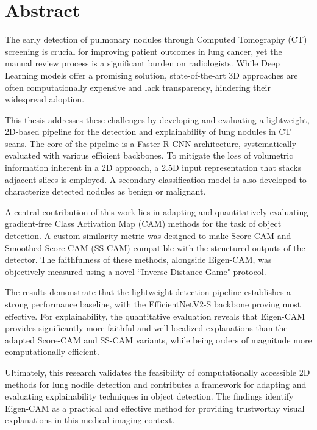 \documentclass{book}
\begin{document}
\fontsize{11.5pt}{14pt}\selectfont
 

\frontmatter
\chapter*{Abstract}
    The early detection of pulmonary nodules through Computed Tomography (CT) screening is crucial for improving patient outcomes in lung cancer, yet the manual review process is a significant burden on radiologists. While Deep Learning models offer a promising solution, state-of-the-art 3D approaches are often computationally expensive and lack transparency, hindering their widespread adoption.

    This thesis addresses these challenges by developing and evaluating a lightweight, 2D-based pipeline for the detection and explainability of lung nodules in CT scans. The core of the pipeline is a Faster R-CNN architecture, systematically evaluated with various efficient backbones. To mitigate the loss of volumetric information inherent in a 2D approach, a 2.5D input representation that stacks adjacent slices is employed. A secondary classification model is also developed to characterize detected nodules as benign or malignant.

    A central contribution of this work lies in adapting and quantitatively evaluating gradient-free Class Activation Map (CAM) methods for the task of object detection. A custom similarity metric was designed to make Score-CAM and Smoothed Score-CAM (SS-CAM) compatible with the structured outputs of the detector. The faithfulness of these methods, alongside Eigen-CAM, was objectively measured using a novel ``Inverse Distance Game" protocol.

    The results demonstrate that the lightweight detection pipeline establishes a strong performance baseline, with the EfficientNetV2-S backbone proving most effective. For explainability, the quantitative evaluation reveals that Eigen-CAM provides significantly more faithful and well-localized explanations than the adapted Score-CAM and SS-CAM variants, while being orders of magnitude more computationally efficient.

    Ultimately, this research validates the feasibility of computationally accessible 2D methods for lung nodile detection and contributes a framework for adapting and evaluating explainability techniques in object detection. The findings identify Eigen-CAM as a practical and effective method for providing trustworthy visual explanations in this medical imaging context.

\tableofcontents

\mainmatter














\end{document}
